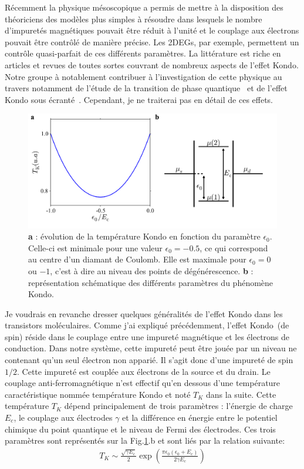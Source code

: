Récemment la physique mésoscopique a permis de mettre à la disposition des théoriciens des modèles plus simples à résoudre dans lesquels le nombre d'impuretés magnétiques pouvait être réduit à l'unité et le couplage aux électrons pouvait être contrôlé de manière précise. Les 2DEGs, par exemple, permettent un contrôle quasi-parfait de ces différents paramètres. La littérature est riche en articles et revues de toutes sortes couvrant de nombreux aspects de l'effet Kondo. Notre groupe à notablement contribuer à l'investigation de cette physique au travers notamment de l'étude de la transition de phase quantique~\cite{Roch2008} et de l'effet Kondo sous écranté~\cite{Roch2009}. Cependant, je ne traiterai pas en détail de ces effets.

\begin{figure}
\includegraphics[scale=0.5]{Theorie/Transport/figure6/figure6.pdf} 
\caption{\textbf{a} : évolution de la température Kondo en fonction du paramètre $\epsilon_0$. Celle-ci est minimale pour une valeur $\epsilon_0=-0.5$, ce qui correspond au centre d'un diamant de Coulomb. Elle est maximale pour $\epsilon_0=0$ ou $-1$, c'est à dire au niveau des points de dégénérescence. \textbf{b} : représentation schématique des différents paramètres du phénomène Kondo.}
\label{Kondo_param}
\end{figure}


Je voudrais en revanche dresser quelques généralités de l'effet Kondo dans les transistors moléculaires. Comme j'ai expliqué précédemment, l'effet Kondo~(de spin) réside dans le couplage entre une impureté magnétique et les électrons de conduction. Dans notre système, cette impureté peut être jouée par un niveau ne contenant qu'un seul électron non apparié. Il s'agit donc d'une impureté de spin $1/2$. Cette impureté est couplée aux électrons de la source et du drain. Le couplage anti-ferromagnétique n'est effectif qu'en dessous d'une température caractéristique nommée température Kondo et noté $T_K$ dans la suite. Cette température $T_K$ dépend principalement de trois paramètres : l'énergie de charge $E_c$, le couplage aux électrodes $\gamma$ et la différence en énergie entre le potentiel chimique du point quantique et le niveau de Fermi des électrodes. Ces trois paramètres sont représentés sur la Fig.\ref{Kondo_param}.b et sont liés par la relation suivante:
\begin{eqnarray}
T_K \sim \frac{\sqrt{\gamma E_c}}{2} \exp(\frac{\pi \epsilon_0(\epsilon_0 + E_c)}{2\gamma E_c})
\end{eqnarray}


